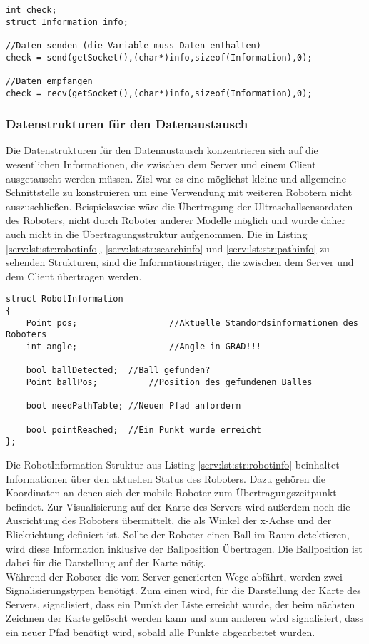 \begin{lstlisting}[frame=tb,captionpos=b,caption=Senden und Empfangen., label=serv:lst:sendenempfangen]
int check;
struct Information info;

//Daten senden (die Variable muss Daten enthalten)
check = send(getSocket(),(char*)info,sizeof(Information),0);

//Daten empfangen
check = recv(getSocket(),(char*)info,sizeof(Information),0);
\end{lstlisting}

\subsubsection{Datenstrukturen für den Datenaustausch}\label{serv:datenstrukturen}

Die Datenstrukturen für den Datenaustausch konzentrieren sich auf die wesentlichen Informationen, die zwischen dem Server und einem Client ausgetauscht werden müssen. Ziel war es eine möglichst kleine und allgemeine Schnittstelle zu konstruieren um eine Verwendung mit weiteren Robotern nicht auszuschließen. Beispielsweise wäre die Übertragung der Ultraschallsensordaten des Roboters, nicht durch Roboter anderer Modelle möglich und wurde daher auch nicht in die Übertragungsstruktur aufgenommen. Die in Listing \ref{serv:lst:str:robotinfo}, \ref{serv:lst:str:searchinfo} und \ref{serv:lst:str:pathinfo}  zu sehenden Strukturen, sind die Informationsträger, die zwischen dem Server und dem Client übertragen werden.

\begin{lstlisting}[frame=tb,captionpos=b,caption=Datenstruktur RobotInformation., label=serv:lst:str:robotinfo]
struct RobotInformation
{			
	Point pos;					//Aktuelle Standordsinformationen des Roboters
	int angle;					//Angle in GRAD!!!

	bool ballDetected;	//Ball gefunden?
	Point ballPos;			//Position des gefundenen Balles

	bool needPathTable; //Neuen Pfad anfordern

	bool pointReached; 	//Ein Punkt wurde erreicht
};
\end{lstlisting}

Die RobotInformation-Struktur aus Listing \ref{serv:lst:str:robotinfo} beinhaltet Informationen über den aktuellen Status des Roboters. Dazu gehören die Koordinaten an denen sich der mobile Roboter zum Übertragungszeitpunkt befindet. Zur Visualisierung auf der Karte des Servers wird außerdem noch die Ausrichtung des Roboters übermittelt, die als Winkel der x-Achse und der Blickrichtung definiert ist. Sollte der Roboter einen Ball im Raum detektieren, wird diese Information inklusive der Ballposition Übertragen. Die Ballposition ist dabei für die Darstellung auf der Karte nötig.\\ Während der Roboter die vom Server generierten Wege abfährt, werden zwei Signalisierungstypen benötigt. Zum einen wird, für die Darstellung der Karte des Servers, signalisiert, dass ein Punkt der Liste erreicht wurde, der beim nächsten Zeichnen der Karte gelöscht werden kann und zum anderen wird signalisiert, dass ein neuer Pfad benötigt wird, sobald alle Punkte abgearbeitet wurden. 

